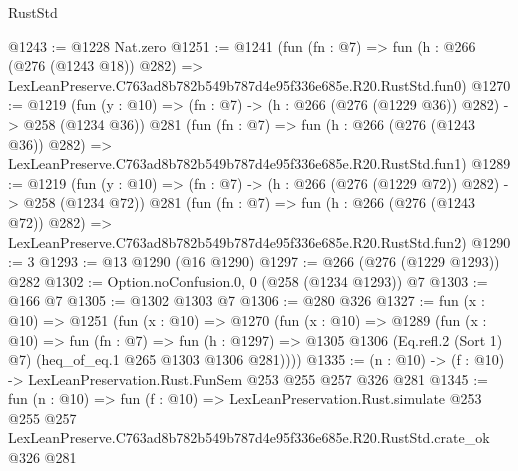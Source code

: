\begin{lexlean}{RustStd}
\begin{coremodule}
@1243 := @1228 Nat.zero
@1251 := @1241
    (fun (fn : @7) =>
    fun (h : @266 (@276 (@1243 @18)) @282) =>
    LexLeanPreserve.C763ad8b782b549b787d4e95f336e685e.R20.RustStd.fun0)
@1270 := @1219
    (fun (y : @10) => (fn : @7) -> (h : @266 (@276 (@1229 @36)) @282) -> @258 (@1234 @36))
    @281
    (fun (fn : @7) =>
    fun (h : @266 (@276 (@1243 @36)) @282) =>
    LexLeanPreserve.C763ad8b782b549b787d4e95f336e685e.R20.RustStd.fun1)
@1289 := @1219
    (fun (y : @10) => (fn : @7) -> (h : @266 (@276 (@1229 @72)) @282) -> @258 (@1234 @72))
    @281
    (fun (fn : @7) =>
    fun (h : @266 (@276 (@1243 @72)) @282) =>
    LexLeanPreserve.C763ad8b782b549b787d4e95f336e685e.R20.RustStd.fun2)
@1290 := 3
@1293 := @13 @1290 (@16 @1290)
@1297 := @266 (@276 (@1229 @1293)) @282
@1302 := Option.noConfusion.{0, 0} (@258 (@1234 @1293)) @7
@1303 := @166 @7
@1305 := @1302 @1303 @7
@1306 := @280 @326
@1327 := fun (x : @10) =>
  @1251
    (fun (x : @10) =>
    @1270
      (fun (x : @10) =>
      @1289
        (fun (x : @10) =>
        fun (fn : @7) =>
        fun (h : @1297) =>
        @1305 @1306 (Eq.refl.{2} (Sort 1) @7) (heq_of_eq.{1} @265 @1303 @1306 @281))))
@1335 := (n : @10) -> (f : @10) -> LexLeanPreservation.Rust.FunSem @253 @255 @257 @326 @281
@1345 := fun (n : @10) =>
  fun (f : @10) =>
  LexLeanPreservation.Rust.simulate
    @253
    @255
    @257
    LexLeanPreserve.C763ad8b782b549b787d4e95f336e685e.R20.RustStd.crate_ok
    @326
    @281
\end{coremodule}
\end{lexlean}
